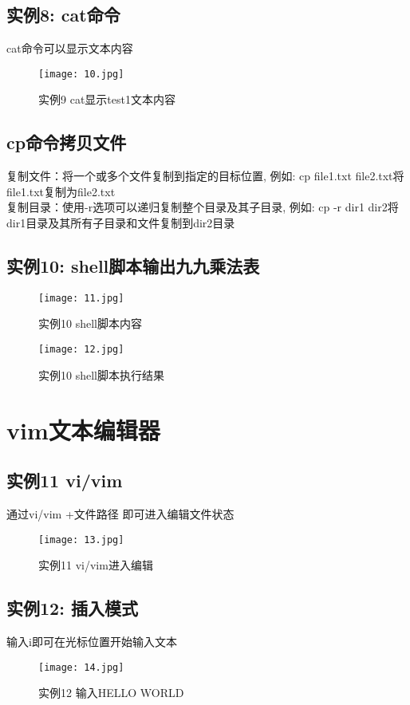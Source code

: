 \documentclass[a4paper, 12pt]{article}
\begin{document}
  \subsection{实例8: cat命令}
  cat命令可以显示文本内容
  \begin{figure}[h!]
    \centering
    \texttt{[image: 10.jpg]}
    \caption{实例9 cat显示test1文本内容}
  \end{figure}
  \subsection{cp命令拷贝文件}
\noindent 复制文件：将一个或多个文件复制到指定的目标位置,
  例如: cp file1.txt file2.txt将file1.txt复制为file2.txt\\
复制目录：使用-r选项可以递归复制整个目录及其子目录,
例如: cp -r dir1 dir2将dir1目录及其所有子目录和文件复制到dir2目录

\subsection{实例10: shell脚本输出九九乘法表}
\begin{figure}[h!]
    \centering
    \texttt{[image: 11.jpg]}
    \caption{实例10 shell脚本内容}
  \end{figure}
  \begin{figure}[h!]
    \centering
    \texttt{[image: 12.jpg]}
    \caption{实例10 shell脚本执行结果}
  \end{figure}
\section{vim文本编辑器}
\subsection{实例11 vi/vim}
通过vi/vim +文件路径 即可进入编辑文件状态
\begin{figure}[h!]
    \centering
    \texttt{[image: 13.jpg]}
    \caption{实例11 vi/vim进入编辑}
  \end{figure}
  \subsection{实例12: 插入模式}
  输入i即可在光标位置开始输入文本
  \begin{figure}[h!]
    \centering
    \texttt{[image: 14.jpg]}
    \caption{实例12 输入HELLO WORLD}
  \end{figure}
\end{document}
